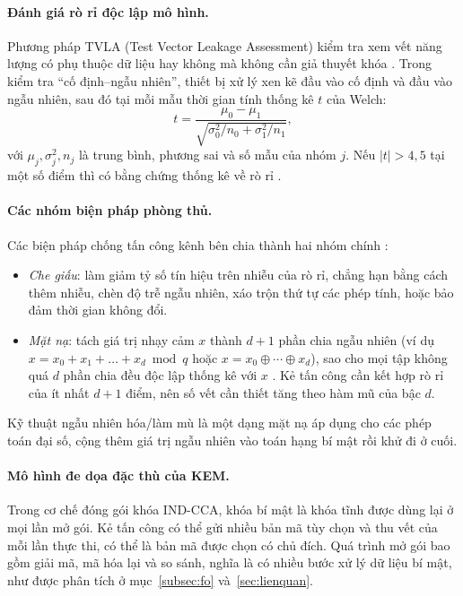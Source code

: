 \documentclass[../LuanVan.tex]{subfiles}
\begin{document}
\paragraph{Đánh giá rò rỉ độc lập mô hình.} Phương pháp TVLA (Test Vector Leakage Assessment) kiểm tra xem vết năng lượng có phụ thuộc dữ liệu hay không mà không cần giả thuyết khóa \cite{GoodwillJJR11,SchneiderMoradi15}. Trong kiểm tra ``cố định--ngẫu nhiên'', thiết bị xử lý xen kẽ đầu vào cố định và đầu vào ngẫu nhiên, sau đó tại mỗi mẫu thời gian tính thống kê $t$ của Welch:
\begin{equation}
    t = \frac{\mu_0-\mu_1}{\sqrt{\sigma_0^2/n_0+\sigma_1^2/n_1}},
\end{equation}
với $\mu_j,\sigma_j^2,n_j$ là trung bình, phương sai và số mẫu của nhóm $j$. Nếu $|t|>4{,}5$ tại một số điểm thì có bằng chứng thống kê về rò rỉ \cite{GoodwillJJR11}.

\paragraph{Các nhóm biện pháp phòng thủ.} Các biện pháp chống tấn công kênh bên chia thành hai nhóm chính \cite{MangardOP07}:
\begin{itemize}
    \item \textit{Che giấu}: làm giảm tỷ số tín hiệu trên nhiễu của rò rỉ, chẳng hạn bằng cách thêm nhiễu, chèn độ trễ ngẫu nhiên, xáo trộn thứ tự các phép tính, hoặc bảo đảm thời gian không đổi.
    \item \textit{Mặt nạ}: tách giá trị nhạy cảm $x$ thành $d+1$ phần chia ngẫu nhiên (ví dụ $x=x_0+x_1+\dots+x_d \bmod q$ hoặc $x=x_0\oplus\cdots\oplus x_d$), sao cho mọi tập không quá $d$ phần chia đều độc lập thống kê với $x$ \cite{ChariJRR99,ISW03}. Kẻ tấn công cần kết hợp rò rỉ của ít nhất $d+1$ điểm, nên số vết cần thiết tăng theo hàm mũ của bậc $d$.
\end{itemize}
Kỹ thuật ngẫu nhiên hóa/làm mù là một dạng mặt nạ áp dụng cho các phép toán đại số, cộng thêm giá trị ngẫu nhiên vào toán hạng bí mật rồi khử đi ở cuối.

\paragraph{Mô hình đe dọa đặc thù của KEM.} Trong cơ chế đóng gói khóa IND-CCA, khóa bí mật là khóa tĩnh được dùng lại ở mọi lần mở gói. Kẻ tấn công có thể gửi nhiều bản mã tùy chọn và thu vết của mỗi lần thực thi, có thể là bản mã được chọn có chủ đích. Quá trình mở gói bao gồm giải mã, mã hóa lại và so sánh, nghĩa là có nhiều bước xử lý dữ liệu bí mật, như được phân tích ở mục~\ref{subsec:fo} và~\ref{sec:lienquan}.
\end{document}
